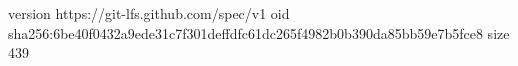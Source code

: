 version https://git-lfs.github.com/spec/v1
oid sha256:6be40f0432a9ede31c7f301deffdfc61dc265f4982b0b390da85bb59e7b5fce8
size 439
